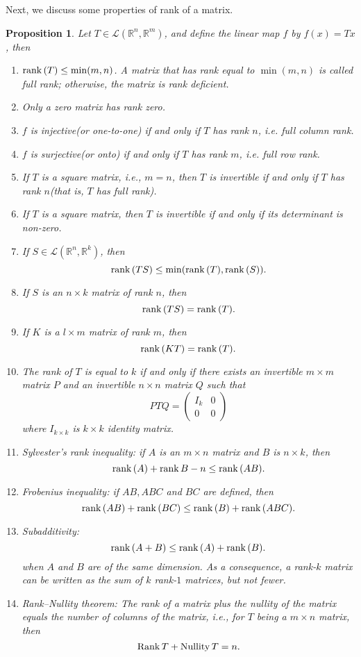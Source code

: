 \documentclass[11pt]{book}
\newtheorem{proposition}{Proposition}[section]
\theoremstyle{definition}
\numberwithin{equation}{subsection}
\begin{document}
Next, we discuss some properties of rank of a matrix.
\begin{proposition}
Let $T\in\mathscr{L}(\mathbb{R}^n,\mathbb{R}^m)$, and define the linear map $f$ by $f(x) = Tx$, then
\begin{enumerate}[label=(\arabic*)]
    \item ${\rm rank}\,(T)\leq \min(m,n)$. A matrix that has rank equal to $\min(m, n)$ is called full rank; otherwise, the matrix is rank deficient.
    \item Only a zero matrix has rank zero.
    \item $f$ is injective(or one-to-one) if and only if $T$ has rank $n$, i.e. full column rank.
    \item $f$ is surjective(or onto) if and only if $T$ has rank $m$, i.e. full row rank.
    \item If $T$ is a square matrix, i.e., $m = n$, then $T$ is invertible if and only if $T$ has rank $n$(that is, $T$ has full rank).
    \item If $T$ is a square matrix, then $T$ is invertible if and only if its determinant is non-zero.
    \item If $S\in\mathscr{L}(\mathbb{R}^n,\mathbb{R}^k)$, then $${\rm rank}\,(TS) \leq \min( {\rm rank}\,(T), {\rm rank}\,(S)).$$
    \item If $S$ is an $n\times k$ matrix of rank $n$, then $${\rm rank}\,(TS) = {\rm rank}\,(T).$$
    \item If $K$ is a $l\times m$ matrix of rank $m$, then$${\rm rank}\,(KT) = {\rm rank}\,(T).$$
    \item The rank of $T$ is equal to $k$ if and only if there exists an invertible $m\times m$ matrix $P$ and an invertible $n\times n$ matrix $Q$ such that
    $$PTQ = \left(
        \begin{matrix}
        I_{k} & 0 \\
        0 & 0
        \end{matrix}
    \right)$$
    where $I_{k\times k}$ is $k\times k$ identity matrix.
    \item Sylvester’s rank inequality: if $A$ is an $m\times n$ matrix and $B$ is $n\times k$, then
    $${\rm rank}\,(A) + {\rm rank}\,B - n \leq {\rm rank}\,(AB).$$
    \item Frobenius inequality: if $AB, ABC$ and $BC$ are defined, then
    $${\rm rank}\,(AB) + {\rm rank}\,(BC) \leq {\rm rank}\,(B) + {\rm rank}\,(ABC).$$
    \item Subadditivity:
    $${\rm rank}\, (A+B)\leq {\rm rank}\, (A)+{\rm rank}\, (B).$$
    when $A$ and $B$ are of the same dimension. As a consequence, a rank-$k$ matrix can be written as the sum of $k$ rank-$1$ matrices, but not fewer.
    \item Rank–Nullity theorem: The rank of a matrix plus the nullity of the matrix equals the number of columns of the matrix, i.e., for $T$ being a $m\times n$ matrix, then $${\rm Rank}\, T + {\rm Nullity}\, T = n.$$
\end{enumerate}
\end{proposition}
\end{document}
